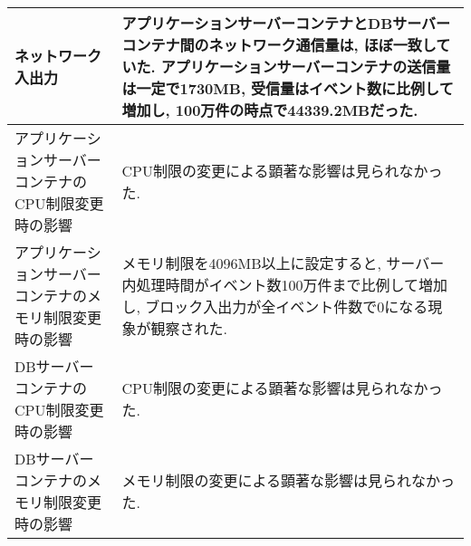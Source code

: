 \documentclass[../../../main]{subfiles}
\begin{document}
\begin{table}[H]
\begin{tabular}{|p{4cm}|p{10cm}|}
            ネットワーク入出力                    & アプリケーションサーバーコンテナとDBサーバーコンテナ間のネットワーク通信量は, ほぼ一致していた. アプリケーションサーバーコンテナの送信量は一定で1730MB, 受信量はイベント数に比例して増加し, 100万件の時点で44339.2MBだった.  \\ \hline
            アプリケーションサーバーコンテナのCPU制限変更時の影響 & CPU制限の変更による顕著な影響は見られなかった.                                                                                                 \\ \hline
            アプリケーションサーバーコンテナのメモリ制限変更時の影響 & メモリ制限を4096MB以上に設定すると, サーバー内処理時間がイベント数100万件まで比例して増加し, ブロック入出力が全イベント件数で0になる現象が観察された.                                          \\ \hline
            DBサーバーコンテナのCPU制限変更時の影響       & CPU制限の変更による顕著な影響は見られなかった.                                                                                                 \\ \hline
            DBサーバーコンテナのメモリ制限変更時の影響       & メモリ制限の変更による顕著な影響は見られなかった.                                                                                                 \\ \hline
        \end{tabular}
    \end{table}
\end{document}
